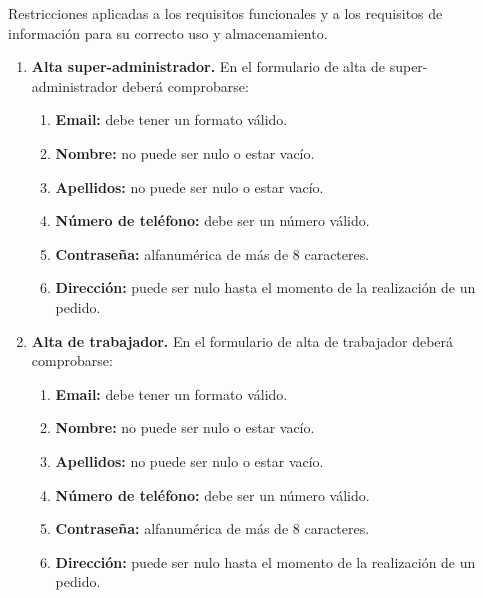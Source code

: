 Restricciones aplicadas a los requisitos funcionales y a los requisitos de información
para su correcto uso y almacenamiento.

\begin{enumerate}[leftmargin=1.75cm,start=1,label={\bfseries RS-\arabic*.}]
\setlength\itemsep{1em} %

    \item \textbf{Alta super-administrador.} En el formulario de alta de super-administrador deberá comprobarse:
    \begin{enumerate}[start=1,label={\bfseries RS-1.\arabic*.}]
        \item \textbf{Email:} debe tener un formato válido.
        \item \textbf{Nombre:} no puede ser nulo o estar vacío.
        \item \textbf{Apellidos:} no puede ser nulo o estar vacío.
        \item \textbf{Número de teléfono:} debe ser un número válido.
        \item \textbf{Contraseña:} alfanumérica de más de 8 caracteres.
        \item \textbf{Dirección:} puede ser nulo hasta el momento de la realización de un pedido.
    \end{enumerate}

    \item \textbf{Alta de trabajador.} En el formulario de alta de trabajador deberá comprobarse:
    \begin{enumerate}[start=1,label={\bfseries RS-2.\arabic*.}]
        \item \textbf{Email:} debe tener un formato válido.
        \item \textbf{Nombre:} no puede ser nulo o estar vacío.
        \item \textbf{Apellidos:} no puede ser nulo o estar vacío.
        \item \textbf{Número de teléfono:} debe ser un número válido.
        \item \textbf{Contraseña:} alfanumérica de más de 8 caracteres.
        \item \textbf{Dirección:} puede ser nulo hasta el momento de la realización de un pedido.
    \end{enumerate}


\end{enumerate}
